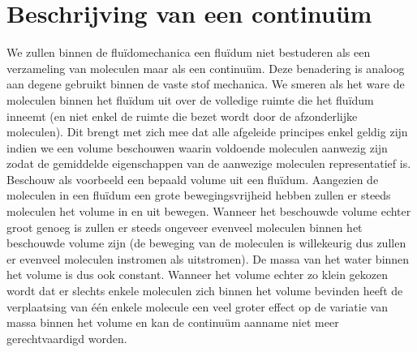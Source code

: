 	\section{Beschrijving van een continu\"um}
	\label{sec:Beschrijving van een continuum}	
We zullen binnen de flu\"idomechanica een flu\"idum niet bestuderen als een verzameling van moleculen maar als een continu\"um. Deze benadering is analoog aan degene gebruikt binnen de vaste stof mechanica.
We smeren als het ware de moleculen binnen het flu\"idum uit over de volledige ruimte die het flu\"idum inneemt (en niet enkel de ruimte die bezet wordt door de afzonderlijke moleculen). Dit brengt met zich mee dat alle afgeleide principes enkel geldig zijn indien we een volume beschouwen waarin voldoende moleculen aanwezig zijn zodat de gemiddelde eigenschappen van de aanwezige moleculen representatief is.
\npar
Beschouw als voorbeeld een bepaald volume uit een flu\"idum. Aangezien de moleculen in een flu\"idum een grote bewegingsvrijheid hebben zullen er steeds moleculen het volume in en uit bewegen. Wanneer het beschouwde volume echter groot genoeg is zullen er steeds ongeveer evenveel moleculen binnen het beschouwde volume zijn (de beweging van de moleculen is willekeurig dus zullen er evenveel moleculen instromen als uitstromen). De massa van het water binnen het volume is dus ook constant. Wanneer het volume echter zo klein gekozen wordt dat er slechts enkele moleculen zich binnen het volume bevinden heeft de verplaatsing van \'e\'en enkele molecule een veel groter effect op de variatie van massa binnen het volume en kan de continu\"um aanname niet meer gerechtvaardigd worden.
\npar

